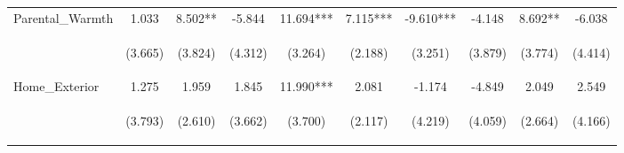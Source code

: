 \begin{tabular}{lccccccccc}
\noalign{\smallskip}Parental_Warmth & 1.033 & 8.502** & -5.844 & 11.694*** & 7.115*** & -9.610*** & -4.148 & 8.692** & -6.038\\
 & \begin{footnotesize}(3.665)\end{footnotesize} & \begin{footnotesize}(3.824)\end{footnotesize} & \begin{footnotesize}(4.312)\end{footnotesize} & \begin{footnotesize}(3.264)\end{footnotesize} & \begin{footnotesize}(2.188)\end{footnotesize} & \begin{footnotesize}(3.251)\end{footnotesize} & \begin{footnotesize}(3.879)\end{footnotesize} & \begin{footnotesize}(3.774)\end{footnotesize} & \begin{footnotesize}(4.414)\end{footnotesize}\\
\noalign{\smallskip}Home_Exterior & 1.275 & 1.959 & 1.845 & 11.990*** & 2.081 & -1.174 & -4.849 & 2.049 & 2.549\\
 & \begin{footnotesize}(3.793)\end{footnotesize} & \begin{footnotesize}(2.610)\end{footnotesize} & \begin{footnotesize}(3.662)\end{footnotesize} & \begin{footnotesize}(3.700)\end{footnotesize} & \begin{footnotesize}(2.117)\end{footnotesize} & \begin{footnotesize}(4.219)\end{footnotesize} & \begin{footnotesize}(4.059)\end{footnotesize} & \begin{footnotesize}(2.664)\end{footnotesize} & \begin{footnotesize}(4.166)\end{footnotesize}\\

\end{tabular}
